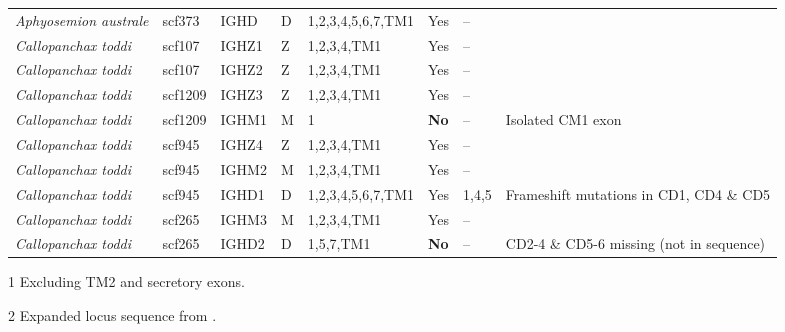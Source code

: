 \begin{landscape}
\begin{threeparttable}
\begin{tabular}{>{\itshape}lllllllp{4cm}}
  Aphyosemion australe & scf373 & IGHD & D & 1,2,3,4,5,6,7,TM1 & Yes & -- &  \\ 
  Callopanchax toddi & scf107 & IGHZ1 & Z & 1,2,3,4,TM1 & Yes & -- &  \\ 
  Callopanchax toddi & scf107 & IGHZ2 & Z & 1,2,3,4,TM1 & Yes & -- &  \\ 
  Callopanchax toddi & scf1209 & IGHZ3 & Z & 1,2,3,4,TM1 & Yes & -- &  \\ 
  Callopanchax toddi & scf1209 & IGHM1 & M & 1 & \textbf{No} & -- & Isolated CM1 exon \\ 
  Callopanchax toddi & scf945 & IGHZ4 & Z & 1,2,3,4,TM1 & Yes & -- &  \\ 
  Callopanchax toddi & scf945 & IGHM2 & M & 1,2,3,4,TM1 & Yes & -- &  \\ 
  Callopanchax toddi & scf945 & IGHD1 & D & 1,2,3,4,5,6,7,TM1 & Yes & 1,4,5 & Frameshift mutations in CD1, CD4 \& CD5 \\ 
  Callopanchax toddi & scf265 & IGHM3 & M & 1,2,3,4,TM1 & Yes & -- &  \\ 
  Callopanchax toddi & scf265 & IGHD2 & D & 1,5,7,TM1 & \textbf{No} & -- & CD2-4 \& CD5-6 missing (not in sequence) \\ 
   \bottomrule \end{tabular}
	\begin{tablenotes}
	\item[1] Excluding TM2 and secretory exons.
	\item[2] Expanded \igh{} locus sequence from .
	\end{tablenotes}
	\end{threeparttable}
	\normalsize\vspace{1em}
	\label{tab:multispecies-ch-regions-1}
    \vspace*{\fill}
    \end{landscape}

